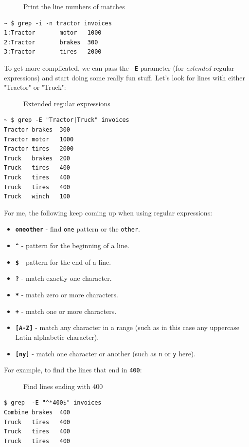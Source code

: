 \documentclass[10pt,]{book}
\numberwithin{figure}{chapter}
\DeclareRobustCommand{\drcap}[1]{\begin{figure}[H]\caption{#1}\end{figure}}
\begin{document}
\drcap{Print the line numbers of matches}

\begin{verbatim}
~ $ grep -i -n tractor invoices
1:Tractor       motor   1000
2:Tractor       brakes  300
3:Tractor       tires   2000
\end{verbatim}

To get more complicated, we can pass the \texttt{-E} parameter (for
\emph{extended} regular expressions) and start doing some really fun
stuff. Let's look for lines with either "Tractor" or "Truck":

\drcap{Extended regular expressions}

\begin{verbatim}
~ $ grep -E "Tractor|Truck" invoices
Tractor brakes  300
Tractor motor   1000
Tractor tires   2000
Truck   brakes  200
Truck   tires   400
Truck   tires   400
Truck   tires   400
Truck   winch   100
\end{verbatim}

For me, the following keep coming up when using regular expressions:

\begin{itemize}
\itemsep1pt\parskip0pt
\item
  \textbf{\texttt{one\textbar{}other}} - find \texttt{one} pattern or
  the \texttt{other}.
\item
  \textbf{\texttt{\^{}}} - pattern for the beginning of a line.
\item
  \textbf{\texttt{\$}} - pattern for the end of a line.
\item
  \textbf{\texttt{?}} - match exactly one character.
\item
  \textbf{\texttt{*}} - match zero or more characters.
\item
  \textbf{\texttt{+}} - match one or more characters.
\item
  \textbf{\texttt{{[}A-Z{]}}} - match any character in a range (such as
  in this case any uppercase Latin alphabetic character).
\item
  \textbf{\texttt{{[}n\textbar{}y{]}}} - match one character or another
  (such as \texttt{n} or \texttt{y} here).
\end{itemize}

For example, to find the lines that end in \texttt{400}:

\drcap{Find lines ending with 400}

\begin{verbatim}
$ grep  -E "^*400$" invoices
Combine brakes  400
Truck   tires   400
Truck   tires   400
Truck   tires   400
\end{verbatim}
\end{document}
